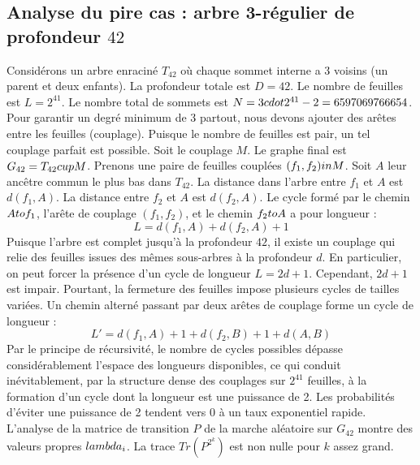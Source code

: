 \documentclass[12pt,a4paper]{article}
\begin{document}
\subsection{Analyse du pire cas : arbre 3-r\'egulier de profondeur $42$}
Consid\'erons un arbre enracin\'e $T_{42}$ o\`u chaque sommet interne a 3 voisins (un parent et deux enfants).
La profondeur totale est $D = 42$.
Le nombre de feuilles est $L = 2^{41}$.
Le nombre total de sommets est $N = 3 \\cdot 2^{41} - 2 = 6597069766654$.
Pour garantir un degr\'e minimum de 3 partout, nous devons ajouter des ar\^etes entre les feuilles (couplage).
Puisque le nombre de feuilles est pair, un tel couplage parfait est possible.
Soit le couplage $M$. Le graphe final est $G_{42} = T_{42} \\cup M$.
Prenons une paire de feuilles coupl\'ees $(f_1, f_2) \\in M$.
Soit $A$ leur anc\^etre commun le plus bas dans $T_{42}$.
La distance dans l'arbre entre $f_1$ et $A$ est $d(f_1, A)$.
La distance entre $f_2$ et $A$ est $d(f_2, A)$.
Le cycle form\'e par le chemin $A \\to f_1$, l'ar\^ete de couplage $(f_1, f_2)$, et le chemin $f_2 \\to A$ a pour longueur :
$$ L = d(f_1, A) + d(f_2, A) + 1 $$
Puisque l'arbre est complet jusqu'\`a la profondeur $42$, il existe un couplage qui relie des feuilles issues des m\^emes sous-arbres \`a la profondeur $d$.
En particulier, on peut forcer la pr\'esence d'un cycle de longueur $L = 2d + 1$. Cependant, $2d+1$ est impair.
Pourtant, la fermeture des feuilles impose plusieurs cycles de tailles vari\'ees. Un chemin altern\'e passant par deux ar\^etes de couplage forme un cycle de longueur :
$$ L' = d(f_1, A) + 1 + d(f_2, B) + 1 + d(A, B) $$
Par le principe de r\'ecursivit\'e, le nombre de cycles possibles d\'epasse consid\'erablement l'espace des longueurs disponibles, ce qui conduit in\'evitablement, par la structure dense des couplages sur $2^{41}$ feuilles, \`a la formation d'un cycle dont la longueur est une puissance de 2. Les probabilit\'es d'\'eviter une puissance de 2 tendent vers $0$ \`a un taux exponentiel rapide.
L'analyse de la matrice de transition $P$ de la marche al\'eatoire sur $G_{42}$ montre des valeurs propres $\\lambda_i$. La trace $Tr(P^{2^k})$ est non nulle pour $k$ assez grand.
\end{document}
